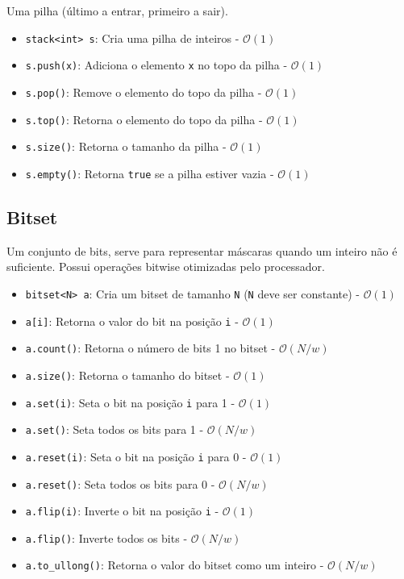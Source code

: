 \documentclass[10pt, a4paper, oneside]{book}
\begin{document}
Uma pilha (último a entrar, primeiro a sair).

\begin{itemize}
    \item \texttt{stack<int> s}: Cria uma pilha de inteiros - $\mathcal{O}(1)$
    \item \texttt{s.push(x)}: Adiciona o elemento \texttt{x} no topo da pilha - $\mathcal{O}(1)$
    \item \texttt{s.pop()}: Remove o elemento do topo da pilha - $\mathcal{O}(1)$
    \item \texttt{s.top()}: Retorna o elemento do topo da pilha - $\mathcal{O}(1)$
    \item \texttt{s.size()}: Retorna o tamanho da pilha - $\mathcal{O}(1)$
    \item \texttt{s.empty()}: Retorna \texttt{true} se a pilha estiver vazia - $\mathcal{O}(1)$
\end{itemize}

\subsection{Bitset}

Um conjunto de bits, serve para representar máscaras quando um inteiro não é suficiente. Possui operações bitwise otimizadas pelo processador.

\begin{itemize}
    \item \texttt{bitset<N> a}: Cria um bitset de tamanho \texttt{N} (\texttt{N} deve ser constante) - $\mathcal{O}(1)$
    \item \texttt{a[i]}: Retorna o valor do bit na posição \texttt{i} - $\mathcal{O}(1)$
    \item \texttt{a.count()}: Retorna o número de bits 1 no bitset - $\mathcal{O}(N / w)$
    \item \texttt{a.size()}: Retorna o tamanho do bitset - $\mathcal{O}(1)$
    \item \texttt{a.set(i)}: Seta o bit na posição \texttt{i} para 1 - $\mathcal{O}(1)$
    \item \texttt{a.set()}: Seta todos os bits para 1 - $\mathcal{O}(N / w)$
    \item \texttt{a.reset(i)}: Seta o bit na posição \texttt{i} para 0 - $\mathcal{O}(1)$
    \item \texttt{a.reset()}: Seta todos os bits para 0 - $\mathcal{O}(N / w)$
    \item \texttt{a.flip(i)}: Inverte o bit na posição \texttt{i} - $\mathcal{O}(1)$
    \item \texttt{a.flip()}: Inverte todos os bits - $\mathcal{O}(N / w)$
    \item \texttt{a.to\_ullong()}: Retorna o valor do bitset como um inteiro - $\mathcal{O}(N / w)$
\end{itemize}
\end{document}
